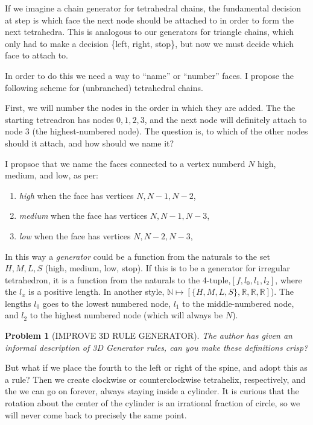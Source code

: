 \documentclass[11pt]{article}
\newtheorem{problem}{Problem}
\begin{document}
If we imagine a chain generator for tetrahedral chains, the fundamental decision at step is which face the next node should be attached to in order
to form the next tetrahedra. This is analogous to our generators for triangle chains, which only had to make a decision \{left, right, stop\}, but
now we must decide which face to attach to.

In order to do this we need a way to ``name'' or ``number'' faces. I propose the following scheme for (unbranched) tetrahedral chains.

First, we will number the nodes in the order in which they are added. The the starting tetreadron has nodes ${0,1,2,3}$, and the next
node will definitely attach to node $3$ (the highest-numbered node). The question is, to which of the other nodes should it attach,
and how should we name it?

I propsoe that we name the faces connected to a vertex numberd $N$ high, medium, and low, as per:
\begin{enumerate}
\item {\em high} when the face has vertices ${N, N-1, N-2}$,
\item {\em medium} when the face has vertices ${N, N-1, N-3}$,
  \item {\em low} when the face has vertices ${N, N-2, N-3}$,    
\end{enumerate}

In this way a {\em generator} could be a function from the naturals to the set ${H,M,L,S}$ (high, medium, low, stop). If this is to be
a generator for irregular tetrahedron, it is a function from the naturals to the 4-tuple,$[f,l_0,l_1,l_2]$, where the $l_x$ is a positive length.
In another style, $\mathbb{N} \mapsto [\{H,M,L,S\},\mathbb{R},\mathbb{R},\mathbb{R}]$). The lengths $l_0$ goes to the lowest numbered node, $l_1$ to the middle-numbered node,
and $l_2$ to the highest numbered node (which will always be $N$).

\begin{problem}[IMPROVE 3D RULE GENERATOR]
  The author has given an informal description of 3D Generator rules, can you make these definitions crisp?
\end{problem}

But what if we place the fourth to the left or right of the spine, and adopt this as a rule? Then we create
clockwise or counterclockwise tetrahelix, respectively, and the we can go on forever, always staying inside a cylinder.
It is curious that the rotation about the center of the cylinder is an irrational fraction of circle, so we will
never come back to precisely the same point.
\end{document}
